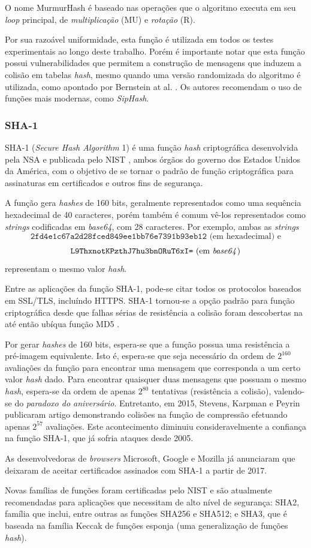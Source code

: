 O nome MurmurHash é baseado nas operações que o algoritmo executa em seu \emph{loop} principal, de \emph{multiplicação} (MU) e \emph{rotação} (R). 

Por sua razoável uniformidade, esta função é utilizada em todos os testes experimentais ao longo deste trabalho. Porém é importante notar que esta função possui vulnerabilidades que permitem a construção de mensagens que induzem a colisão em tabelas \emph{hash}, mesmo quando uma versão randomizada do algoritmo é utilizada, como apontado por Bernstein at al. \cite{bernsteinhash}. Os autores recomendam o uso de funções mais modernas, como \emph{SipHash}.

\subsubsection{SHA-1}

SHA-1 (\emph{Secure Hash Algorithm} 1) é uma função \emph{hash} criptográfica desenvolvida pela NSA e publicada pelo NIST \cite{fips2012180}, ambos órgãos do governo dos Estados Unidos da América, com o objetivo de se tornar o padrão de função criptográfica para assinaturas em certificados e outros fins de segurança.

A função gera \emph{hashes} de 160 bits, geralmente representados como uma sequência hexadecimal de 40 caracteres, porém também é comum vê-los representados como \emph{strings} codificadas em \emph{base64}, com 28 caracteres. Por exemplo, ambas as \emph{strings} 
\[
\texttt{2fd4e1c67a2d28fced849ee1bb76e7391b93eb12} \text{ (em hexadecimal) e}
\]
\[
\texttt{L9ThxnotKPzthJ7hu3bnORuT6xI=} \text{ (em \emph{base64})}
\]
representam o mesmo valor \emph{hash}.

Entre as aplicações da função SHA-1, pode-se citar todos os protocolos baseados em SSL/TLS, incluíndo HTTPS. SHA-1 tornou-se a opção padrão para função criptográfica desde que falhas sérias de resistência a colisão foram descobertas na até então ubíqua função MD5 \cite{wang2005break}.

Por gerar \emph{hashes} de 160 bits, espera-se que a função possua uma resistência a pré-imagem equivalente. Isto é, espera-se que seja necessário da ordem de $2^{160}$ avaliações da função para encontrar uma mensagem que corresponda a um certo valor \emph{hash} dado. Para encontrar quaisquer duas mensagens que possuam o mesmo \emph{hash}, espera-se da ordem de apenas $2^{80}$ tentativas (resistência a colisão), valendo-se do \emph{paradoxo do aniversário}. Entretanto, em 2015, Stevens, Karpman e Peyrin \cite{cryptoeprint:2015:967} publicaram artigo demonstrando colisões na função de compressão efetuando apenas $2^{57}$ avaliações. Este acontecimento diminuiu consideravelmente a confiança na função SHA-1, que já sofria ataques desde 2005.

As desenvolvedoras de \emph{browsers} Microsoft, Google e Mozilla já anunciaram que deixaram de aceitar certificados assinados com SHA-1 a partir de 2017.

Novas famílias de funções foram certificadas pelo NIST e são atualmente recomendadas para aplicações que necessitam de alto nível de segurança: SHA2, família que inclui, entre outras as funções SHA256 e SHA512; e SHA3, que é baseada na família Keccak de funções esponja (uma generalização de funções \emph{hash}).